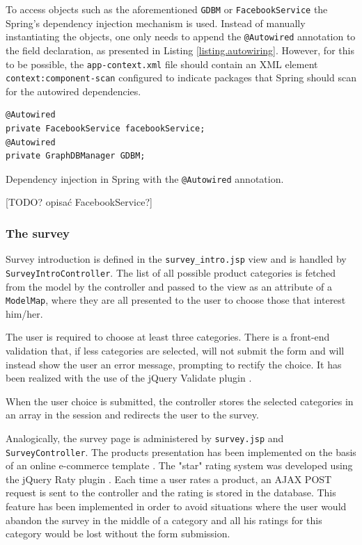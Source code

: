 \documentclass[12pt]{report}
\begin{document}
\hbox{}
To access objects such as the aforementioned \texttt{GDBM} or \texttt{Facebook\-Service} the Spring's dependency injection mechanism is used. Instead of manually instantiating the objects, one only needs to append the \texttt{@Autowired} annotation to the field declaration, as presented in Listing \ref{listing.autowiring}. However, for this to be possible, the \texttt{app-context.xml} file should contain an XML element \texttt{context:\-component\--scan} configured to indicate packages that Spring should scan for the autowired dependencies.

\begin{listing}
\begin{verbatim}
@Autowired
private FacebookService facebookService;
@Autowired
private GraphDBManager GDBM;
\end{verbatim}
\caption{Dependency injection in Spring with the \texttt{@Autowired} annotation.}
\label{listing.autowiring}
\end{listing}

[TODO? opisać FacebookService?]

\subsubsection{The survey}

Survey introduction is defined in the \texttt{survey\-\_intro\-.jsp} view and is handled by \texttt{Survey\-Intro\-Controller}. The list of all possible product categories is fetched from the model by the controller and passed to the view as an attribute of a \texttt{Model\-Map}, where they are all presented to the user to choose those that interest him/her. 

The user is required to choose at least three categories. There is a front-end validation that, if less categories are selected, will not submit the form and will instead show the user an error message, prompting to rectify the choice. It has been realized with the use of the jQuery Validate plugin \cite{jquery_validate}.

When the user choice is submitted, the controller stores the selected categories in an array in the session and redirects the user to the survey.

\hbox{}
Analogically, the survey page is administered by \texttt{survey\-.jsp} and \texttt{Survey\-Controller}. The products presentation has been implemented on the basis of an online e-commerce template \cite{bootply_ecommerce}. The "star" rating system was developed using the jQuery Raty plugin \cite{jquery_raty}. Each time a user rates a product, an AJAX POST request is sent to the controller and the rating is stored in the database. This feature has been implemented in order to avoid situations where the user would abandon the survey in the middle of a category and all his ratings for this category would be lost without the form submission.
\end{document}
